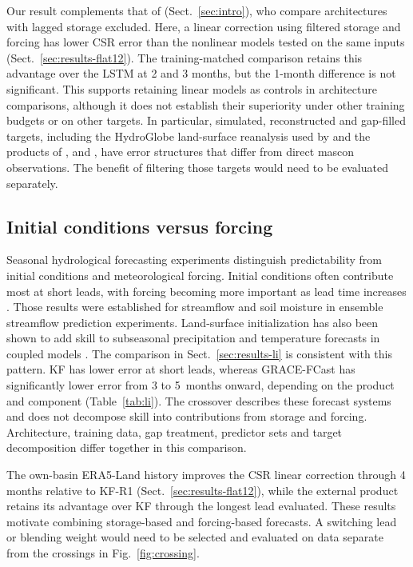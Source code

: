 \documentclass[hess, manuscript]{copernicus}
\begin{document}
Our result complements that of \citet{nie2025linear}
(Sect.~\ref{sec:intro}), who compare architectures with lagged storage
excluded. Here, a linear correction using filtered storage and forcing
has lower CSR error than the nonlinear models tested on the same inputs
(Sect.~\ref{sec:results-flat12}). The training-matched comparison retains
this advantage over the LSTM at 2 and 3 months, but the 1-month difference
is not significant. This supports retaining linear models as controls in
architecture comparisons, although it does not establish their superiority
under other training budgets or on other targets. In particular, simulated,
reconstructed and gap-filled targets, including the HydroGlobe
land-surface reanalysis used by \citet{nie2025linear} and the products of \citet{humphrey2019gracerec},
\citet{yin2023gtws} and \citet{mo2022gap}, have error structures that differ
from direct mascon observations. The benefit of filtering those targets
would need to be evaluated separately.

\subsection{Initial conditions versus forcing}
\label{sec:disc-crossing}

Seasonal hydrological forecasting experiments distinguish predictability
from initial conditions and meteorological forcing. Initial conditions
often contribute most at short leads, with forcing becoming more
important as lead time increases \citep{wood2008esp,
shukla2011seasonal, yossef2013skill}. Those results were established for
streamflow and soil moisture in ensemble streamflow prediction
experiments. Land-surface initialization has also been shown to add skill
to subseasonal precipitation and temperature forecasts in coupled models
\citep{koster2010glace2}. The
comparison in Sect.~\ref{sec:results-li} is consistent with this pattern.
KF has lower error at short leads, whereas GRACE-FCast has significantly
lower error from 3 to 5~months onward, depending on the product and
component (Table~\ref{tab:li}). The crossover describes these forecast systems and
does not decompose skill into contributions from storage and forcing.
Architecture, training data, gap treatment, predictor sets and target
decomposition differ together in this comparison.

The own-basin ERA5-Land history improves the CSR linear correction through
4 months relative to KF-R1 (Sect.~\ref{sec:results-flat12}), while the
external product retains its advantage over KF through the longest lead
evaluated. These results motivate combining storage-based and forcing-based
forecasts. A switching lead or blending weight would need to be selected
and evaluated on data separate from the crossings in
Fig.~\ref{fig:crossing}.
\end{document}
